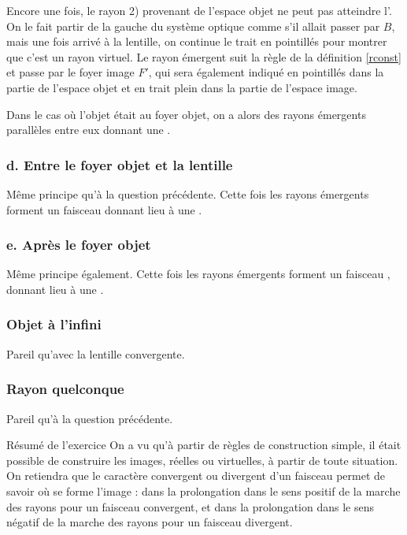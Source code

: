 \documentclass[10pt,a5paper,notitlepage]{book}
\begin{document}
Encore une fois, le rayon \textcolor{brandeisblue}{2)} provenant de l'espace
objet ne peut pas atteindre l'. On le fait partir de la gauche
du système optique comme s'il allait passer par $B$, mais une fois arrivé à la
lentille, on continue le trait en pointillés pour montrer que c'est un rayon
virtuel. Le rayon émergent suit la règle de la définition \ref{rconst} et passe
par le foyer image $F'$, qui sera également indiqué en pointillés dans la partie
de l'espace objet et en trait plein dans la partie de l'espace image. \bigbreak

Dans le cas où l'objet était au foyer objet, on a alors des rayons émergents
parallèles entre eux donnant une .

\setcounter{subsubsection}{0}
\subsubsection{d. Entre le foyer objet et la lentille}
Même principe qu'à la question précédente. Cette fois les rayons émergents
forment un faisceau  donnant lieu à une .

\setcounter{subsubsection}{0}
\subsubsection{e. Après le foyer objet}
Même principe également. Cette fois les rayons émergents forment un faisceau
, donnant lieu à une .

\subsubsection{Objet à l'infini}
Pareil qu'avec la lentille convergente.

\subsubsection{Rayon quelconque}
Pareil qu'à la question précédente.

\begin{impo}[label = resma]{Résumé de l'exercice}
    On a vu qu'à partir de règles de construction simple, il était possible de
    construire les images, réelles ou virtuelles, à partir de toute situation.
    On retiendra que le caractère convergent ou divergent d'un faisceau permet
    de savoir où se forme l'image : dans la prolongation dans le sens positif de
    la marche des rayons pour un faisceau convergent, et dans la prolongation
    dans le sens négatif de la marche des rayons pour un faisceau divergent.
\end{impo}
\end{document}
